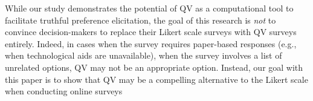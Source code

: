 While our study demonstrates the potential of QV as a computational tool to facilitate truthful preference elicitation, the goal of this research is \textit{not} to convince decision-makers to replace their Likert scale surveys with QV surveys entirely. Indeed, in cases when the survey requires paper-based responses (e.g., when technological aids are unavailable), when the survey involves a list of unrelated options, {} QV may not be an appropriate option. Instead, our goal with this paper is to show that QV may be a compelling alternative to the Likert scale when conducting online surveys {}  
